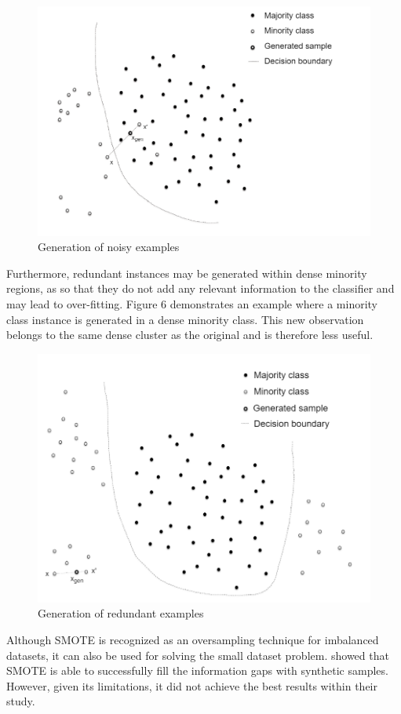 \documentclass[parskip=full]{scrartcl}
\begin{document}
\begin{figure}[H]
	\centering
	\includegraphics[width=0.6\linewidth]{../analysis/noisy_examples}
	\caption{Generation of noisy examples \cite{Douzas.2019b}}
	\label{fig:noisy-examples}
\end{figure}

Furthermore, redundant instances may be generated within dense minority regions, as so that they do 
not add any relevant information to the classifier and may lead to over-fitting. Figure 6 demonstrates 
an example where a minority  class instance is generated in a dense minority class. This new 
observation belongs to the same dense cluster as the original and is therefore less useful. 

\begin{figure}[H]
	\centering
	\includegraphics[width=0.6\linewidth]{../analysis/redundant_examples}
	\caption{Generation of redundant examples \cite{Douzas.2019b}}
	\label{fig:redundant-examples}
\end{figure}

Although SMOTE is recognized as an oversampling technique for imbalanced datasets, it can also be 
used for solving the small dataset problem.  \cite{Li.2018} showed that SMOTE is able to successfully 
fill the information gaps with synthetic samples. However, given its limitations, it did not achieve the 
best results within their study.
\end{document}
